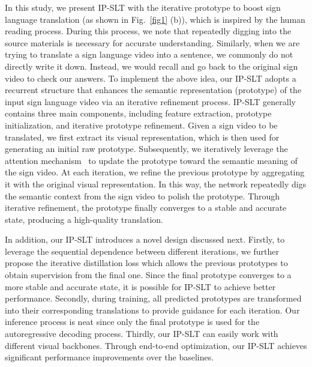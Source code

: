 \documentclass[10pt,twocolumn,letterpaper]{article}
\begin{document}
In this study, we present IP-SLT with the iterative prototype to boost sign language translation (as shown in Fig.~\ref{fig1} (b)), which is inspired by the human reading process.
During this process, we note that repeatedly digging into the source materials is necessary for accurate understanding.
Similarly, when we are trying to translate a sign language video into a sentence, we commonly do not directly write it down. Instead, we would recall and go back to the original sign video to check our answers. To implement the above idea, our IP-SLT adopts a recurrent structure that enhances the semantic representation (prototype) of the input sign language video via an iterative refinement process. 
IP-SLT generally contains three main components, including feature extraction, prototype initialization, and iterative prototype refinement. 
Given a sign video to be translated, we first extract its visual representation, which is then used 
for generating an initial raw prototype. 
Subsequently, we iteratively leverage the attention mechanism~\cite{vaswani2017attention} to update the prototype toward the semantic meaning of the sign video.
At each iteration, we refine the previous prototype by aggregating it with the original visual representation.
In this way,
the network repeatedly digs the semantic context from the sign video to polish the prototype.
Through iterative refinement, the prototype finally converges to a stable and accurate state, producing a high-quality translation. 

In addition, 
our IP-SLT introduces a novel design discussed next.
Firstly, to leverage the sequential dependence between different iterations, we further propose the iterative distillation loss which allows the previous prototypes to obtain supervision from the final one. Since the final prototype converges to a more stable and accurate state, it is possible for IP-SLT to achieve better performance.
Secondly, during training, all predicted prototypes are transformed into their corresponding translations to provide guidance for each iteration.
Our inference process is neat since only the final prototype is used for the autoregressive decoding process.
Thirdly, our IP-SLT can easily work with different visual backbones. 
Through end-to-end optimization, our IP-SLT achieves significant performance improvements over the baselines.
\end{document}
